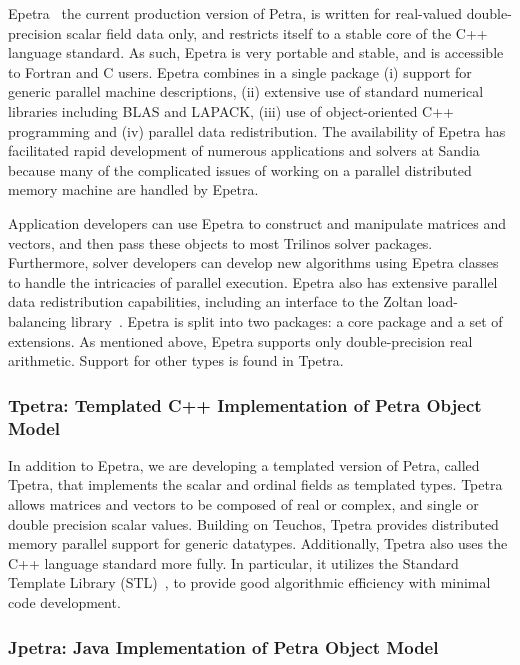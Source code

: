\documentclass[12pt,relax]{TPA}
\begin{document}
Epetra~\cite{Epetra-Ref-Guide} the current production version of Petra,
 is written for real-valued double-precision scalar field data only, and
restricts itself to a stable core
of the C++ language standard.  As such, Epetra is very portable and 
stable, and  
is accessible to Fortran and C users.  
Epetra combines in a single package (i) support 
for generic parallel
machine descriptions, (ii) extensive use of standard numerical 
libraries including BLAS and LAPACK, (iii) use of object-oriented C++ programming and (iv) parallel data 
redistribution.  The availability of Epetra has 
facilitated rapid development
of numerous applications and solvers at Sandia because many of the 
complicated issues of
working on a parallel distributed memory machine are handled by Epetra.

Application developers can use Epetra to construct and manipulate matrices
and vectors, and then pass these objects to most Trilinos solver packages.
Furthermore, solver developers can develop new algorithms using 
Epetra classes to handle the intricacies of parallel execution.  
Epetra also has extensive parallel data  redistribution capabilities, 
including an interface to the Zoltan load-balancing
library~\cite{zoltan-ug}.  Epetra is split into two packages:  a core
package and a set of extensions.  As mentioned above, Epetra supports
only double-precision real arithmetic.  Support for other types is
found in Tpetra.

\subsubsection{Tpetra: Templated C++ Implementation of Petra Object Model}

In addition to Epetra, we are developing a templated 
version of Petra, called Tpetra, that implements the scalar and 
ordinal fields as templated types.  Tpetra 
allows matrices and vectors to be composed of real or complex, 
and single or double precision scalar values.  Building on Teuchos,
Tpetra provides distributed memory parallel support for generic
datatypes.  Additionally, Tpetra also uses the 
C++ language standard more fully.  In particular, it utilizes the 
Standard Template Library (STL)~\cite{Stroustrup}, to provide good 
algorithmic efficiency with minimal code development.

\subsubsection{Jpetra: Java Implementation of Petra Object Model}
\end{document}
